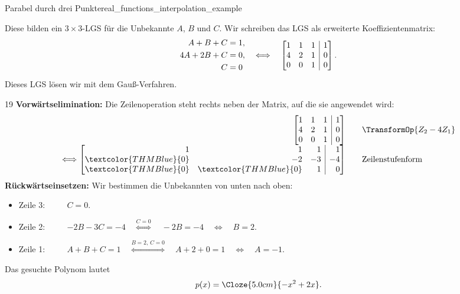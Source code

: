 \begin{ExampleBox}{Parabel durch drei Punkte}{real_functions_interpolation_example}
  \par\smallskip\noindent
  Diese bilden ein $3\times3$-LGS für die Unbekannte $A$, $B$ und $C$. Wir schreiben das LGS als
  erweiterte Koeffizientenmatrix:
  \[
    \begin{aligned}
      A+B+C&=1,\\
      4A+2B+C&=0,\\
      C&=0
    \end{aligned}
    \quad\Longleftrightarrow\quad
    \left[\begin{array}{@{}rrr|r@{}}
      1&1&1&1\\
      4&2&1&0\\
      0&0&1&0
    \end{array}\right].
  \]
  Dieses LGS lösen wir mit dem Gauß-Verfahren.
  \begin{ClozeArea}[34]{19}
    \textbf{Vorwärtselimination:} Die Zeilenoperation steht rechts neben der
    Matrix, auf die sie angewendet wird:
    \[
      \begin{array}{r@{\;}r@{\qquad}l}
        &\left[\begin{array}{@{}rrr|r@{}}
          1&1&1&1\\
          4&2&1&0\\
          0&0&1&0
        \end{array}\right]
        &\begin{array}{@{}l@{}}
          {}\\
          \smash{\TransformOp{Z_2-4Z_1}}\\
          {}
        \end{array}\\[1.0em]
        \Longleftrightarrow
        &\left[\begin{array}{@{}rrr|r@{}}
          1&1&1&1\\
          \textcolor{THMBlue}{0}&-2&-3&-4\\
          \textcolor{THMBlue}{0}&\textcolor{THMBlue}{0}&1&0
        \end{array}\right]
        &\text{Zeilenstufenform}
      \end{array}
    \]
    \textbf{Rückwärtseinsetzen:} Wir bestimmen die Unbekannten von unten nach oben:
    \begin{itemize}[leftmargin=1.4em,itemsep=0.55em,topsep=0.3em]
      \item Zeile 3: $\qquad$
        $C=0.$
      \item Zeile 2: $\qquad$
        $-2B-3C=-4
        \quad \overset{C=0}{\Longleftrightarrow} \quad
        -2B=-4
        \quad \Longleftrightarrow \quad
        B=2.$
      \item Zeile 1: $\qquad$
        $A+B+C=1
        \quad \overset{B=2,\,C=0}{\Longleftrightarrow} \quad
         A+2+0=1
         \quad \Longleftrightarrow \quad
         A=-1.$
    \end{itemize}
  \end{ClozeArea}
  Das gesuchte Polynom lautet
  \[
    p(x)=\Cloze{5.0cm}{-x^2+2x}.
  \]
\end{ExampleBox}
